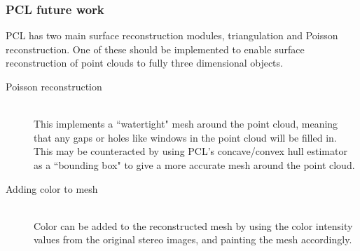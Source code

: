 \subsubsection{PCL future work}
PCL has two main surface reconstruction modules, triangulation and Poisson reconstruction. One of these should be implemented to enable surface reconstruction of point clouds to fully three dimensional objects.
\begin{description}
\item[Poisson reconstruction]\hfill \\
This implements a ``watertight" mesh around the point cloud, meaning that any gaps or holes like windows in the point cloud will be filled in. This may be counteracted by using PCL's concave/convex hull estimator as a ``bounding box" to give a more accurate mesh around the point cloud.
\item[Adding color to mesh]\hfill \\
Color can be added to the reconstructed mesh by using the color intensity values from the original stereo images, and painting the mesh accordingly.
\end{description}



